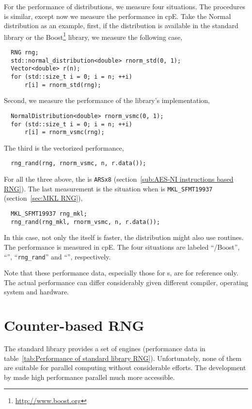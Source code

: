 For the performance of distributions, we measure four situations. The
procedures is similar, except now we measure the performance in cpE. Take the
Normal distribution as an example, first, if the distribution is available in
the standard library or the Boost\footnote{\url{http://www.boost.org}} library,
we measure the following case,
\begin{Verbatim}
  RNG rng;
  std::normal_distribution<double> rnorm_std(0, 1);
  Vector<double> r(n);
  for (std::size_t i = 0; i = n; ++i)
      r[i] = rnorm_std(rng);
\end{Verbatim}
Second, we measure the performance of the \vsmc library's implementation,
\begin{Verbatim}
  NormalDistribution<double> rnorm_vsmc(0, 1);
  for (std::size_t i = 0; i = n; ++i)
      r[i] = rnorm_vsmc(rng);
\end{Verbatim}
The third is the vectorized performance,
\begin{Verbatim}
  rng_rand(rng, rnorm_vsmc, n, r.data());
\end{Verbatim}
For all the three above, the \rng is \verb|ARSx8| (section~\ref{sub:AES-NI
  instructions based RNG}). The last measurement is the situation when \rng is
\verb|MKL_SFMT19937| (section~\ref{sec:MKL RNG}),
\begin{Verbatim}
  MKL_SFMT19937 rng_mkl;
  rng_rand(rng_mkl, rnorm_vsmc, n, r.data());
\end{Verbatim}
In this case, not only the \rng itself is faster, the distribution might also
use \mkl routines. The performance is measured in cpE. The four situations are
labeled ``\std/Boost'', ``\vsmc'', ``\verb|rng_rand|'' and ``\mkl'',
respectively.

Note that these performance data, especially those for \rng{}s, are for
reference only. The actual performance can differ considerably given different
compiler, operating system and hardware.

\section{Counter-based RNG}
\label{sec:Counter-based RNG}

The standard library provides a set of \rng engines (performance data in
table~\ref{tab:Performance of standard library RNG}). Unfortunately, none of
them are suitable for parallel computing without considerable efforts. The
development by \textcite{Salmon:2011um} made high performance parallel \rng
much more accessible.

